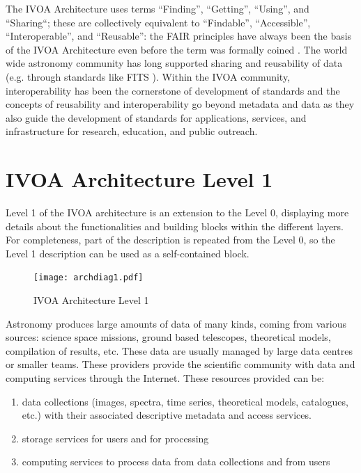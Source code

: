 \documentclass[11pt,letter]{ivoa}
\begin{document}
The IVOA Architecture uses terms ``Finding'', ``Getting'', ``Using'',
and ``Sharing``;
these are collectively equivalent to ``Findable'', ``Accessible'',
``Interoperable'', and
``Reusable'': the FAIR principles have always been the basis of the IVOA
Architecture
even before the term was formally coined \citep{Wilkinson2016}. The
world wide
astronomy community has long supported sharing and reusability of data
(e.g. through standards
like FITS \citep{std:FITS}). Within the IVOA community, interoperability
has been the cornerstone
of development of standards and the concepts of reusability and
interoperability go beyond
metadata and data as they also guide the development of standards for
applications, services,
and infrastructure for research, education, and public outreach.

\section{IVOA Architecture Level 1}

Level 1 of the IVOA architecture is an extension to the Level 0,
displaying more
details about the functionalities and building blocks within the
different layers.
For completeness, part of the description is repeated from the Level 0,
so the
Level 1 description can be used as a self-contained block.

\begin{figure}[ht]
\centering
\texttt{[image: archdiag1.pdf]}
\caption{IVOA Architecture Level 1}
\label{fig:architecture1}
\end{figure}

Astronomy produces large amounts of data of many kinds, coming from
various sources:
science space missions, ground based telescopes, theoretical models,
compilation
of results, etc. These data are usually managed by large data centres or
smaller teams. These providers provide the scientific community with
data and
computing services through the Internet. These resources provided can
be:

\begin{enumerate}
\item data collections (images, spectra, time series, theoretical
models, catalogues, etc.)
with their associated descriptive metadata and access services.  
\item storage services for users and for processing 
\item computing services to process data from data collections and from
users
\end{enumerate}
\end{document}
